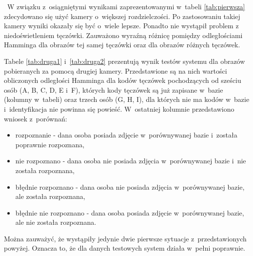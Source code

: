 ~W związku z~osiągniętymi wynikami zaprezentowanymi w~tabeli \ref{tab:pierwsza} zdecydowano się użyć kamery o~większej rozdzielczości. Po zastosowaniu takiej kamery wyniki okazały się być o~wiele lepsze. Ponadto nie wystąpił problem z niedoświetleniem tęczówki. Zauważono wyraźną różnicę pomiędzy odległościami Hamminga dla obrazów tej samej tęczówki oraz dla obrazów różnych tęczówek.

Tabele \ref{tab:druga1} i~\ref{tab:druga2} prezentują wynik testów systemu dla obrazów pobieranych za pomocą drugiej kamery. Przedstawione są na nich wartości obliczonych odległości Hamminga dla kodów tęczówek pochodzących od sześciu osób (A, B, C, D, E i~F), których kody tęczówek są już zapisane w~bazie (kolumny w~tabeli) oraz trzech osób (G, H, I), dla których nie ma kodów w~bazie i~identyfikacja nie powinna się powieść. W~ostatniej kolumnie przedstawiono wniosek z~porównań:
\begin{itemize}
\item rozpoznanie - dana osoba posiada zdjęcie w~porównywanej bazie i~została poprawnie rozpoznana,
\item nie rozpoznano - dana osoba nie posiada zdjęcia w~porównywanej bazie i~nie została rozpoznana,
\item błędnie rozpoznano - dana osoba nie posiada zdjęcia w~porównywanej bazie, ale została rozpoznana,
\item błędnie nie rozpoznano - dana osoba posiada zdjęcie w~porównywanej bazie, ale nie została rozpoznana.
\end{itemize}

Można zauważyć, że wystąpiły jedynie dwie pierwsze sytuacje z~przedstawionych powyżej. Oznacza to, że dla danych testowych system działa w~pełni poprawnie.


